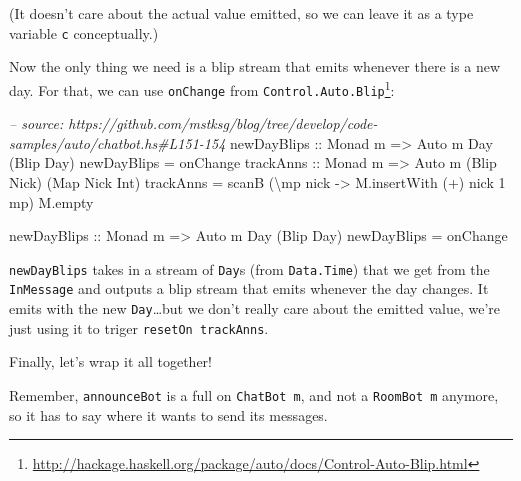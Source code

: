 \documentclass[]{article}
\newenvironment{Shaded}{}{}
\newcommand{\DataTypeTok}[1]{\textcolor[rgb]{0.56,0.13,0.00}{{#1}}}
\newcommand{\DecValTok}[1]{\textcolor[rgb]{0.25,0.63,0.44}{{#1}}}
\newcommand{\CommentTok}[1]{\textcolor[rgb]{0.38,0.63,0.69}{\textit{{#1}}}}
\newcommand{\OtherTok}[1]{\textcolor[rgb]{0.00,0.44,0.13}{{#1}}}
\newcommand{\FunctionTok}[1]{\textcolor[rgb]{0.02,0.16,0.49}{{#1}}}
\newcommand{\NormalTok}[1]{{#1}}
\renewcommand{\href}[2]{#2\footnote{\url{#1}}}
\begin{document}
(It doesn't care about the actual value emitted, so we can leave it as a type
variable \texttt{c} conceptually.)

Now the only thing we need is a blip stream that emits whenever there is a new
day. For that, we can use \texttt{onChange} from
\href{http://hackage.haskell.org/package/auto/docs/Control-Auto-Blip.html}{\texttt{Control.Auto.Blip}}:

\begin{Shaded}
\begin{Highlighting}[]
\CommentTok{-- source: https://github.com/mstksg/blog/tree/develop/code-samples/auto/chatbot.hs#L151-154}
\OtherTok{    newDayBlips ::} \DataTypeTok{Monad} \NormalTok{m }\OtherTok{=>} \DataTypeTok{Auto} \NormalTok{m }\DataTypeTok{Day} \NormalTok{(}\DataTypeTok{Blip} \DataTypeTok{Day}\NormalTok{)}
    \NormalTok{newDayBlips }\FunctionTok{=} \NormalTok{onChange}
\OtherTok{    trackAnns ::} \DataTypeTok{Monad} \NormalTok{m }\OtherTok{=>} \DataTypeTok{Auto} \NormalTok{m (}\DataTypeTok{Blip} \DataTypeTok{Nick}\NormalTok{) (}\DataTypeTok{Map} \DataTypeTok{Nick} \DataTypeTok{Int}\NormalTok{)}
    \NormalTok{trackAnns }\FunctionTok{=} \NormalTok{scanB (\textbackslash{}mp nick }\OtherTok{->} \NormalTok{M.insertWith (}\FunctionTok{+}\NormalTok{) nick }\DecValTok{1} \NormalTok{mp) M.empty}


\OtherTok{newDayBlips ::} \DataTypeTok{Monad} \NormalTok{m }\OtherTok{=>} \DataTypeTok{Auto} \NormalTok{m }\DataTypeTok{Day} \NormalTok{(}\DataTypeTok{Blip} \DataTypeTok{Day}\NormalTok{)}
\NormalTok{newDayBlips }\FunctionTok{=} \NormalTok{onChange}
\end{Highlighting}
\end{Shaded}

\texttt{newDayBlips} takes in a stream of \texttt{Day}s (from
\texttt{Data.Time}) that we get from the \texttt{InMessage} and outputs a blip
stream that emits whenever the day changes. It emits with the new
\texttt{Day}\ldots{}but we don't really care about the emitted value, we're just
using it to triger \texttt{resetOn\ trackAnns}.

Finally, let's wrap it all together!

Remember, \texttt{announceBot} is a full on \texttt{ChatBot\ m}, and not a
\texttt{RoomBot\ m} anymore, so it has to say where it wants to send its
messages.
\end{document}
